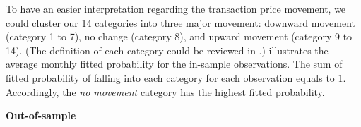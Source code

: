 To have an easier interpretation regarding the transaction price movement, we could cluster our 14 categories into three major movement: downward movement (category 1 to 7), no change (category 8), and upward movement (category 9 to 14). (The definition of each category could be reviewed in .)  illustrates the average monthly fitted probability for the in-sample observations. The sum of fitted probability of falling into each category for each observation equals to 1. Accordingly, the \textit{no movement} category has the highest fitted probability.














{\noindent\bfseries Out-of-sample }
